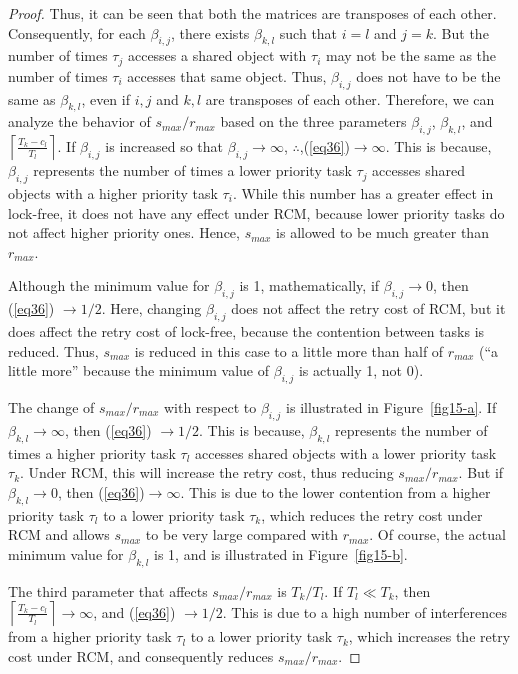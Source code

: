 \documentclass[12pt,english]{report}
\newtheorem{proof}{Proof}
\begin{document}
\begin{proof}
Thus, it can be seen that both the matrices are transposes of
each other. Consequently, for each $\beta_{i,j}$, there exists $\beta_{k,l}$
such that $i=l$ and $j=k$. But the number of times $\tau_{j}$ accesses
a shared object with $\tau_{i}$ may not be the same as the number of times
$\tau_{i}$ accesses that same object. Thus, $\beta_{i,j}$ does not have
to be the same as $\beta_{k,l}$, even if $i,j$ and $k,l$ are transposes 
of each other. Therefore, we can analyze the behavior of $s_{max}/r_{max}$ based on the three parameters $\beta_{i,j}$, $\beta_{k,l}$, and $\left\lceil\frac{T_{k}-c_{l}}{T_{l}}\right\rceil$.
If $\beta_{i,j}$ is increased so that $\beta_{i,j}\rightarrow\infty$,
$\therefore$,(\ref{eq36})$\rightarrow\infty$.
This is because, $\beta_{i,j}$ represents the number of times a lower priority task $\tau_{j}$ accesses 
shared objects with a higher priority task $\tau_{i}$. 
While this number has a greater effect in lock-free, it does not have any effect under RCM, because lower priority tasks do not affect higher priority
ones. Hence, $s_{max}$ is allowed to be much greater than $r_{max}$.

Although the minimum value for $\beta_{i,j}$ is 1, mathematically, if $\beta_{i,j}\rightarrow0$, then (\ref{eq36}) 
 $\rightarrow1/2$.
Here, changing $\beta_{i,j}$ does not affect the retry cost of RCM, but it does affect the retry cost of lock-free, because the contention between tasks is reduced. Thus, $s_{max}$ is reduced in this case to
a little more than half of $r_{max}$ (``a little more''
because the minimum value of $\beta_{i,j}$ is actually 1, not 0).


The change of $s_{max}/r_{max}$ with respect to $\beta_{i,j}$ is illustrated in Figure~\ref{fig15-a}.
If $\beta_{k,l}\rightarrow\infty$, then (\ref{eq36}) $\rightarrow1/2$.
This is because, $\beta_{k,l}$ represents the number of times 
a higher priority task $\tau_{l}$ accesses shared objects with a lower
priority task $\tau_{k}$. Under RCM, this will increase the retry 
cost, thus reducing $s_{max}/r_{max}$. But if $\beta_{k,l}\rightarrow0$, then (\ref{eq36})$\rightarrow\infty$. This is due to the lower contention from a higher priority task $\tau_{l}$ to a lower priority task $\tau_{k}$, which reduces the retry cost under RCM and allows $s_{max}$ to be very large compared with $r_{max}$. Of course, the actual minimum value for $\beta_{k,l}$ is 1, and is illustrated in Figure~\ref{fig15-b}.


The third parameter that affects $s_{max}/r_{max}$ is $T_{k}/T_{l}$.
If $T_{l}\ll T_{k}$, then $\left\lceil\frac{T_{k}-c_{l}}{T_{l}}\right\rceil\rightarrow\infty$,
and (\ref{eq36}) $\rightarrow1/2$. This is due to a high number
of interferences from a higher priority task $\tau_{l}$ to a lower priority
task $\tau_{k}$, which increases the retry cost under RCM, 
and consequently reduces $s_{max}/r_{max}$. 


\end{proof}
\end{document}
